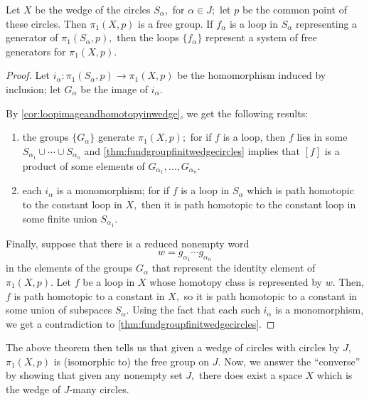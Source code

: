 \documentclass[12pt]{article}
\begin{document}
\begin{thm} \label{thm:fundgroupwedgecircles}
	Let $X$ be the wedge of the circles $S_\alpha,$ for $\alpha \in J;$ let $p$ be the common point of these circles. Then $\pi_1(X, p)$ is a free group. If $f_\alpha$ is a loop in $S_\alpha$ representing a generator of $\pi_1(S_\alpha, p),$ then the loops $\{f_\alpha\}$ represent a system of free generators for $\pi_1(X,p).$
\end{thm}
\begin{proof} 
	Let $i_\alpha : \pi_1(S_\alpha, p) \to \pi_1(X, p)$ be the homomorphism induced by inclusion; let $G_\alpha$ be the image of $i_\alpha.$

	By \cref{cor:loopimageandhomotopyinwedge}, we get the following results:
	\begin{enumerate}
		\item the groups $\{G_\alpha\}$ generate $\pi_1(X, p);$ for if $f$ is a loop, then $f$ lies in some $S_{\alpha_1}\cup\cdots\cup S_{\alpha_n}$ and \cref{thm:fundgroupfinitwedgecircles} implies that $[f]$ is a product of some elements of $G_{\alpha_1},\ldots, G_{\alpha_n}.$
		\item each $i_\alpha$ is a monomorphism; for if $f$ is a loop in $S_\alpha$ which is path homotopic to the constant loop in $X,$ then it is path homotopic to the constant loop in some finite union $S_{\alpha_1}.$
	\end{enumerate}
	Finally, suppose that there is a reduced nonempty word
	\begin{equation*} 
		w = g_{\alpha_1}\cdots g_{\alpha_n}
	\end{equation*}
	in the elements of the groups $G_\alpha$ that represent the identity element of $\pi_1(X, p).$ Let $f$ be a loop in $X$ whose homotopy class is represented by $w.$ Then, $f$ is path homotopic to a constant in $X,$ so it is path homotopic to a constant in some union of subspaces $S_\alpha.$ Using the fact that each such $i_\alpha$ is a monomorphism, we get a contradiction to \cref{thm:fundgroupfinitwedgecircles}.
\end{proof}

The above theorem then tells us that given a wedge of circles with circles by $J,$ $\pi_1(X, p)$ is (isomorphic to) the free group on $J.$ Now, we answer the ``converse'' by showing that given any nonempty set $J,$ there does exist a space $X$ which is the wedge of $J$-many circles.
\end{document}
